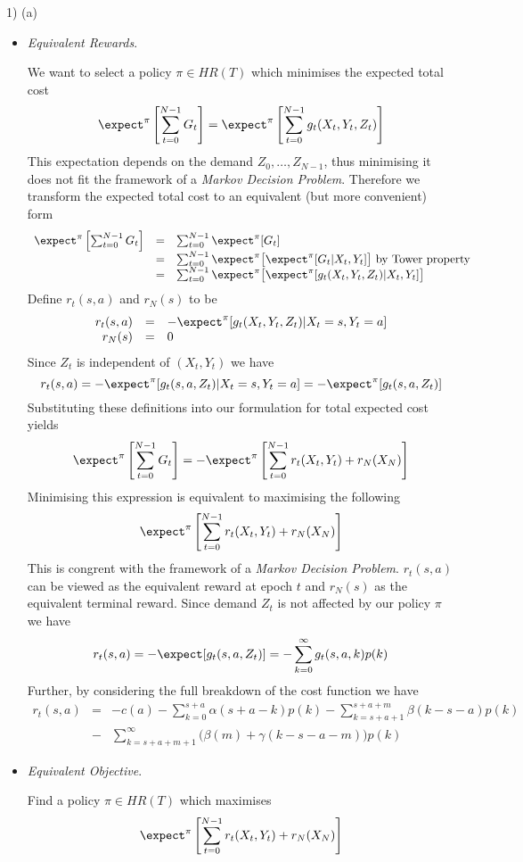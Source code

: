 \documentclass[11pt,a4paper]{article}
\begin{document}
\begin{answer}{1) (a)}
\begin{itemize}
    \item \textit{Equivalent Rewards}.
    \par We want to select a policy $\pi\in HR(T)$ which minimises the expected total cost
    \[ \expect^\pi\left[\sum_{t=0}^{N-1}G_t\right]=\expect^\pi\left[\sum_{t=0}^{N-1}g_t(X_t,Y_t,Z_t)\right] \]
    This expectation depends on the demand $Z_0,\dots,Z_{N-1}$, thus minimising it does not fit the framework of a \textit{Markov Decision Problem}. Therefore we transform the expected total cost to an equivalent (but more convenient) form
    \[\begin{array}{rcl}
      \expect^\pi\left[\sum_{t=0}^{N-1}G_t\right]&=&\sum_{t=0}^{N-1}\expect^\pi[G_t]\\
      &=&\sum_{t=0}^{N-1}\expect^\pi\big[\expect^\pi[G_t|X_t,Y_t]\big]\text{ by Tower property}\\
      &=&\sum_{t=0}^{N-1}\expect^\pi\big[\expect^\pi[g_t(X_t,Y_t,Z_t)|X_t,Y_t]\big]
    \end{array}\]
    Define $r_t(s,a)$ and $r_N(s)$ to be
    \[\begin{array}{rcl}
      r_t(s,a)&=&-\expect^\pi[g_t(X_t,Y_t,Z_t)|X_t=s,Y_t=a]\\
      r_N(s)&=&0
    \end{array}\]
    Since $Z_t$ is independent of $(X_t,Y_t)$ we have
    \[ r_t(s,a)=-\expect^\pi[g_t(s,a,Z_t)|X_t=s,Y_t=a]=-\expect^\pi[g_t(s,a,Z_t)] \]
    Substituting these definitions into our formulation for total expected cost yields
    \[ \expect^\pi\left[\sum_{t=0}^{N-1}G_t\right]=-\expect^\pi\left[\sum_{t=0}^{N-1}r_t(X_t,Y_t)+r_N(X_N)\right] \]
    Minimising this expression is equivalent to maximising the following
    \[ \expect^\pi\left[\sum_{t=0}^{N-1}r_t(X_t,Y_t)+r_N(X_N)\right] \]
    This is congrent with the framework of a \textit{Markov Decision Problem}. $r_t(s,a)$ can be viewed as the equivalent reward at epoch $t$ and $r_N(s)$ as the equivalent terminal reward.
    Since demand $Z_t$ is not affected by our policy $\pi$ we have
    \[ r_t(s,a)=-\expect[g_t(s,a,Z_t)]=-\sum_{k=0}^\infty g_t(s,a,k)p(k) \]
    Further, by considering the full breakdown of the cost function we have
    \[\begin{array}{rcl}
      r_t(s,a)&=&-c(a)-\sum_{k=0}^{s+a}\alpha(s+a-k)p(k)-\sum_{k=s+a+1}^{s+a+m}\beta(k-s-a)p(k)\\
      &-&\sum_{k=s+a+m+1}^\infty\big(\beta(m)+\gamma(k-s-a-m)\big)p(k)
    \end{array}\]

    \item \textit{Equivalent Objective}.
    \par Find a policy $\pi\in HR(T)$ which maximises
    \[ \expect^\pi\left[\sum_{t=0}^{N-1}r_t(X_t,Y_t)+r_N(X_N)\right] \]
  \end{itemize}
\end{answer}
\end{document}
